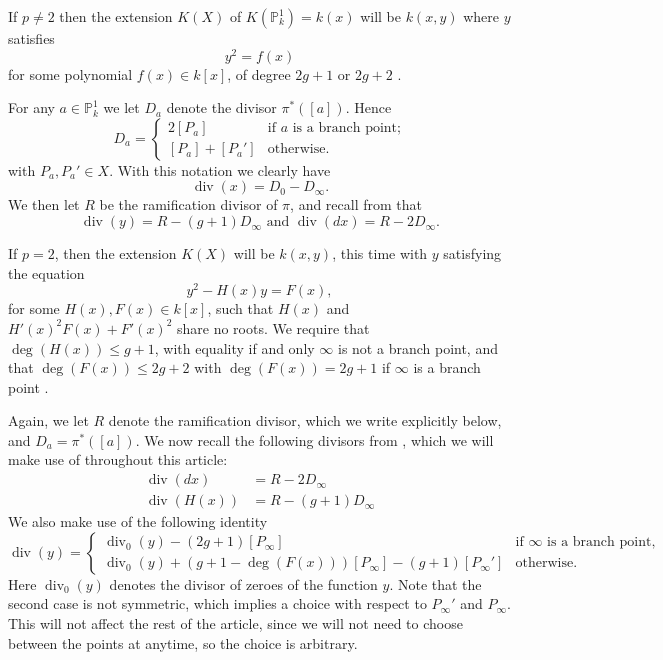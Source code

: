 \documentclass[draft, 11pt]{article} %
\theoremstyle{plain}
\theoremstyle{remark}
\DeclareMathOperator{\di}{div}
\begin{document}
If $p \neq 2$ then the extension $K(X)$ of $K(\mathbb P_k^1) = k(x)$ will be $k(x,y)$ where $y$ satisfies
\begin{equation}\label{definingequationpnot2}
y^2 = f(x)
\end{equation}
for some polynomial $f(x) \in k[x]$, of degree $2g+1$ or $2g+2$ \cite[Prop 7.4.24]{liu}.

For any $a\in \mathbb P_k^1$ we let $D_a$ denote the divisor $\pi^*([a])$.
Hence 
\begin{equation}\label{divisorofpoints}
D_a= 
\begin{cases}
 2[P_a] & \text{if $a$ is a branch point;} \\
 [P_a] + [P_a'] & \text{otherwise.}
\end{cases}
\end{equation}
with $P_a, P_a' \in X$.
With this notation we clearly have
\begin{equation}\label{divxp=2}
\di (x)  = D_0 - D_\infty.
\end{equation}
We then let $R$ be the ramification divisor of $\pi$, and recall from \cite[\S 6]{faithfulaction} that
\begin{equation}\label{pnot2divisors}
\di(y)  = R - (g+1)D_\infty \text{ and } \di( dx) = R - 2D_\infty.
\end{equation}


If $p=2$, then the extension $K(X)$ will be $k(x,y)$, this time with $y$ satisfying the equation
\begin{equation}\label{definep=2}
y^2 - H(x)y = F(x),
\end{equation}
for some $H(x),F(x) \in k[x]$, such that $H(x)$ and $H'(x)^2F(x) + F'(x)^2$ share no roots.
We require that $\deg(H(x)) \leq g+1$, with equality if and only $\infty$ is not a branch point, and that $\deg(F(x)) \leq 2g+2$ with $\deg(F(x)) = 2g+1$ if $\infty$ is a branch point  \cite[Prop 7.4.24]{liu}.



Again, we let $R$ denote the ramification divisor, which we write explicitly below, and $D_a = \pi^*([a])$.
We now recall the following divisors from \cite[\S 6]{faithfulaction}, which we will make use of throughout this article:
\begin{align}
\di (dx) & = R - 2D_\infty \label{divdxp=2}\\
\di (H(x)) & = R - (g+1)D_\infty \label{divhp=2}
\end{align}
We also make use of the following identity
\begin{equation}\label{divyp=2}
\di(y) = \begin{cases}
 \di_0(y) -(2g+1)[P_\infty] & \text{if $\infty$ is a branch point,} \\
 \di_0(y) +(g+1-\deg(F(x)))[P_\infty] - (g+1)[P_\infty'] & \text{otherwise.}
\end{cases}
\end{equation}
Here $\di_0(y)$ denotes the divisor of zeroes of the function $y$.
Note that the second case is not symmetric, which implies a choice with respect to $P_\infty'$ and $P_\infty$.
This will not affect the rest of the article, since we will not need to choose between the points at anytime, so the choice is arbitrary.
\end{document}
